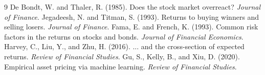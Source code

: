 \documentclass[10pt,a4paper]{article}
\begin{document}
\begin{thebibliography}{9}
 De Bondt, W. and Thaler, R. (1985). Does the stock market overreact? \emph{Journal of Finance}.
 Jegadeesh, N. and Titman, S. (1993). Returns to buying winners and selling losers. \emph{Journal of Finance}.
 Fama, E. and French, K. (1993). Common risk factors in the returns on stocks and bonds. \emph{Journal of Financial Economics}.
 Harvey, C., Liu, Y., and Zhu, H. (2016). ... and the cross-section of expected returns. \emph{Review of Financial Studies}.
 Gu, S., Kelly, B., and Xiu, D. (2020). Empirical asset pricing via machine learning. \emph{Review of Financial Studies}.
\end{thebibliography}
\end{document}
